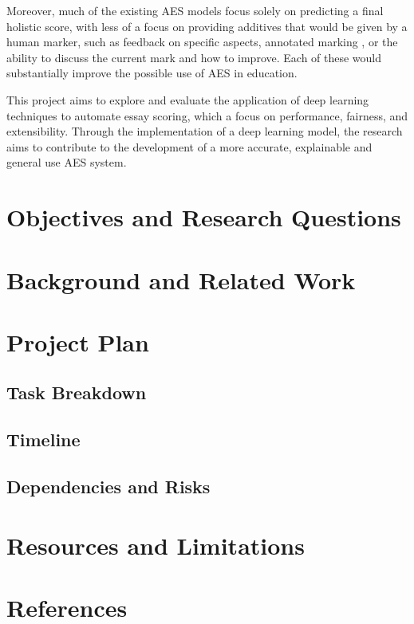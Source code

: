 \documentclass[11pt]{article}
\begin{document}
Moreover, much of the existing AES models focus solely on predicting a final holistic score, with less of a focus on providing additives that would be given by a human marker,
such as feedback on specific aspects, annotated marking , or the ability to discuss the current mark and how to improve. Each of these would substantially improve the
possible use of AES in education.

This project aims to explore and evaluate the application of deep learning techniques to automate essay scoring, which a focus on performance, fairness, and extensibility. Through the implementation of
a deep learning model, the research aims to contribute to the development of a more accurate, explainable and general use AES system.


\section*{Objectives and Research Questions}

\section*{Background and Related Work}

\section*{Project Plan}
\subsection*{Task Breakdown}

\subsection*{Timeline}

\subsection*{Dependencies and Risks}

\section*{Resources and Limitations}

\section*{References}
\end{document}
